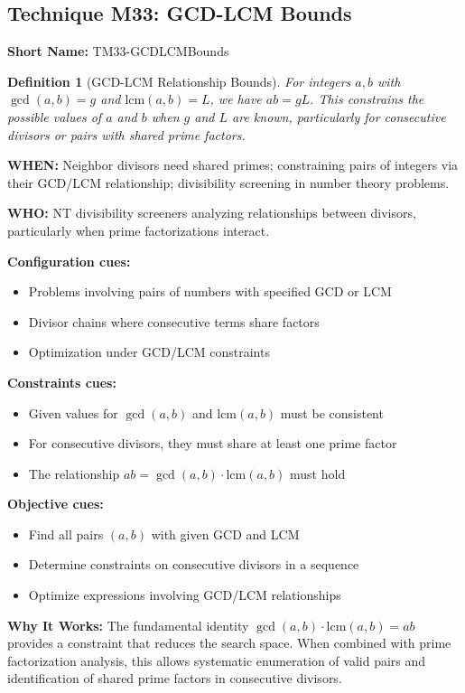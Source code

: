 \documentclass[12pt]{article}
\newtheorem{definition}{Definition}[section]
\begin{document}
\subsection{Technique M33: GCD-LCM Bounds}
\textbf{Short Name:} TM33-GCDLCMBounds

\begin{definition}[GCD-LCM Relationship Bounds]
For integers $a,b$ with $\gcd(a,b)=g$ and $\text{lcm}(a,b)=L$, we have $ab=gL$. This constrains the possible values of $a$ and $b$ when $g$ and $L$ are known, particularly for consecutive divisors or pairs with shared prime factors.
\end{definition}

\textbf{WHEN:} Neighbor divisors need shared primes; constraining pairs of integers via their GCD/LCM relationship; divisibility screening in number theory problems.

\textbf{WHO:} NT divisibility screeners analyzing relationships between divisors, particularly when prime factorizations interact.

\textbf{Configuration cues:}
\begin{itemize}
    \item Problems involving pairs of numbers with specified GCD or LCM
    \item Divisor chains where consecutive terms share factors
    \item Optimization under GCD/LCM constraints
\end{itemize}

\textbf{Constraints cues:}
\begin{itemize}
    \item Given values for $\gcd(a,b)$ and $\text{lcm}(a,b)$ must be consistent
    \item For consecutive divisors, they must share at least one prime factor
    \item The relationship $ab = \gcd(a,b) \cdot \text{lcm}(a,b)$ must hold
\end{itemize}

\textbf{Objective cues:}
\begin{itemize}
    \item Find all pairs $(a,b)$ with given GCD and LCM
    \item Determine constraints on consecutive divisors in a sequence
    \item Optimize expressions involving GCD/LCM relationships
\end{itemize}

\textbf{Why It Works:} The fundamental identity $\gcd(a,b) \cdot \text{lcm}(a,b) = ab$ provides a constraint that reduces the search space. When combined with prime factorization analysis, this allows systematic enumeration of valid pairs and identification of shared prime factors in consecutive divisors.
\end{document}

